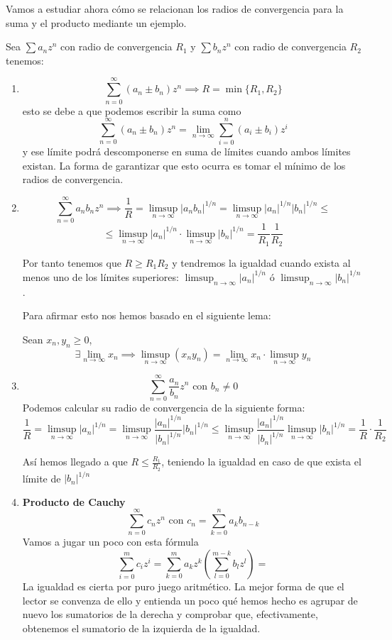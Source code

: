 \documentclass{apuntes}
\begin{document}
Vamos a estudiar ahora cómo se relacionan los radios de convergencia para la suma y el producto mediante un ejemplo.
\begin{example}
Sea $\sum a_nz^n$ con radio de convergencia $R_1$ y $\sum b_n z^n$ con radio de convergencia $R_2$ tenemos:
\begin{enumerate}
\item
\[\sum_{n=0}^{\infty}(a_n\pm b_n)z^n \implies R = \min\{R_1, R_2\}\]
esto se debe a que podemos escribir la suma como
\[\sum_{n=0}^{\infty}(a_n\pm b_n)z^n = \lim_{n \to \infty} \sum_{i=0}^n (a_i\pm b_i)z^i\]
y ese límite podrá descomponerse en suma de límites cuando ambos límites existan. La forma de garantizar que esto ocurra es tomar el mínimo de los radios de convergencia.

\item
\[\sum_{n=0}^{\infty} a_nb_nz^n \implies \frac{1}{R}=\limsup_{ n \to \infty}|a_nb_n|^{1/n} = \limsup_{n\to \infty}|a_n|^{1/n}|b_n|^{1/n} \leq\]
\[\leq \limsup_{n\to \infty} |a_n|^{1/n}\cdot \limsup_{n\to \infty} |b_n|^{1/n} = \frac{1}{R_1}\frac{1}{R_2}\]

Por tanto tenemos que $R \geq R_1R_2$ y tendremos la igualdad cuando exista al menos uno de los límites superiores: $\limsup_{n\to \infty} |a_n|^{1/n}$ ó $\limsup_{n\to \infty}|b_n|^{1/n}$.

Para afirmar esto nos hemos basado en el siguiente lema:
\begin{lemma}
Sean $x_n,y_n \geq 0$,
\[\exists \lim_{n \to \infty} x_n \implies \limsup_{n \to \infty }(x_ny_n)=\lim_{n \to \infty}x_n \cdot \limsup_{n \to \infty} y_n\]
\end{lemma}

\item
\[\sum_{n = 0}^{\infty} \frac{a_n}{b_n}z^n \text{ con } b_n \neq 0\]
Podemos calcular su radio de convergencia de la siguiente forma:
\[\frac{1}{R}=\limsup_{n \to \infty} |a_n|^{1/n} = \limsup_{n \to \infty} \frac{|a_n|^{1/n}}{|b_n|^{1/n}}|b_n|^{1/n} \leq \limsup_{n \to \infty} \frac{|a_n|^{1/n}}{|b_n|^{1/n}}\limsup_{n \to \infty} |b_n|^{1/n}=\frac{1}{R}\cdot \frac{1}{R_2}\]

Así hemos llegado a que $R \leq \frac{R_1}{R_2}$, teniendo la igualdad en caso de que exista el límite de $|b_n|^{1/n}$

\item \textbf{Producto de Cauchy}
\[\sum_{n=0}^{\infty}c_nz^n \text{ con } c_n=\sum_{k=0}^{n}a_kb_{n-k}\]
Vamos a jugar un poco con esta fórmula
\[\sum_{i=0}^{m}c_iz^i = \sum_{k=0}^m a_kz^k\left(\sum_{l=0}^{m-k} b_lz^l \right)=\]
La igualdad es cierta por puro juego aritmético. La mejor forma de que el lector se convenza de ello y entienda un poco qué hemos hecho es agrupar de nuevo los sumatorios de la derecha y comprobar que, efectivamente, obtenemos el sumatorio de la izquierda de la igualdad.


\end{enumerate}
\end{example}
\end{document}
